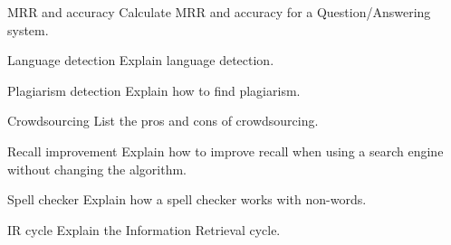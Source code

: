 \documentclass{article}
\begin{document}
\begin{exercise}{MRR and accuracy}
  Calculate MRR and accuracy for a Question/Answering system.

  \begin{solution}
  \end{solution}
\end{exercise}

\begin{exercise}{Language detection}
  Explain language detection.

  \begin{solution}
  \end{solution}
\end{exercise}

\begin{exercise}{Plagiarism detection}
  Explain how to find plagiarism.

  \begin{solution}
  \end{solution}
\end{exercise}

\begin{exercise}{Crowdsourcing}
  List the pros and cons of crowdsourcing.

  \begin{solution}
  \end{solution}
\end{exercise}

\begin{exercise}{Recall improvement}
  Explain how to improve recall when using a search engine without changing the algorithm.

  \begin{solution}
  \end{solution}
\end{exercise}

\begin{exercise}{Spell checker}
  Explain how a spell checker works with non-words.

  \begin{solution}
  \end{solution}
\end{exercise}

\begin{exercise}{IR cycle}
  Explain the Information Retrieval cycle.

  \begin{solution}
  \end{solution}
\end{exercise}
\end{document}

